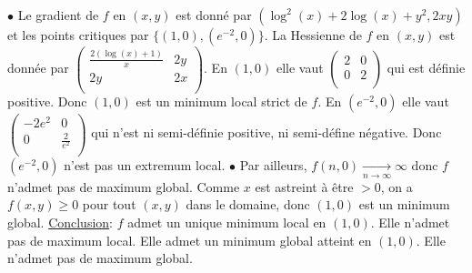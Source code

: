 \documentclass{report}
\begin{document}
\subsection{} \noindent{}\\ 
\\ 
\\
\noindent 
$\bullet$ Le gradient de $f$ en $(x,y)$ est donné par $\left(\log ^2(x)+2 \log (x)+y^2,2 x y\right)$ et les points critiques par $\{(1,0),(e^{-2},0) \}$. \newline
La Hessienne de $f$ en $(x,y)$ est donnée par $\left(
\begin{array}{cc}
 \frac{2 (\log (x)+1)}{x} & 2 y \\
 2 y & 2 x \\
\end{array}
\right)$. \newline
En $(1,0)$ elle vaut $\left(
\begin{array}{cc}
 2 & 0 \\
 0 & 2 \\
\end{array}
\right)$ qui est définie positive. Donc $(1,0)$ est un minimum local strict de $f$.\newline
En $(e^{-2},0)$ elle vaut $\left(
\begin{array}{cc}
 -2 e^2 & 0 \\
 0 & \frac{2}{e^2} \\
\end{array}
\right)$ qui n'est ni semi-définie positive, ni semi-défine négative. Donc $(e^{-2},0)$ n'est pas un extremum local. \newline
$\bullet$ Par ailleurs, $f(n,0)\xrightarrow[n\to \infty]{}\infty$ donc $f$ n'admet pas de maximum global. \newline
Comme $x$ est astreint à être $>0$, on a $f(x,y)\geq 0$ pour tout $(x,y)$ dans le domaine, donc $(1,0)$ est un minimum global.
\newline
\newline
\underline{Conclusion}: $f$ admet un unique minimum local en $(1,0)$. Elle n'admet pas de maximum local. Elle admet un minimum global atteint en $(1,0)$. Elle n'admet pas de maximum global.
\end{document}

